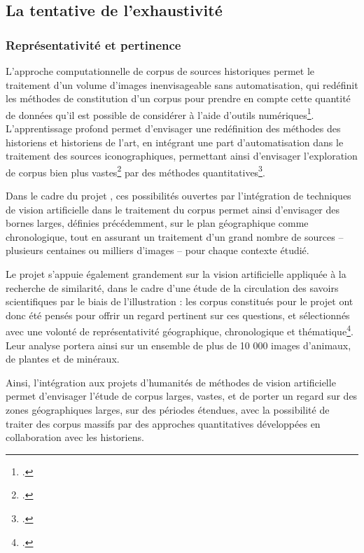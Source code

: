 
\subsection{La tentative de l’exhaustivité}
    \subsubsection{Représentativité et pertinence}
	L'approche computationnelle de corpus de sources historiques permet le traitement d'un volume d'images inenvisageable sans automatisation, qui redéfinit les méthodes de constitution d'un corpus pour prendre en compte cette quantité de données qu'il est possible de considérer à l'aide d'outils numériques\footcite{klinkeBigImageData2016}. L'apprentissage profond permet d'envisager une redéfinition des méthodes des historiens et historiens de l'art, en intégrant une part d'automatisation dans le traitement des sources iconographiques, permettant ainsi d'envisager l'exploration de corpus bien plus vastes\footcite{moiraghiExplorerCorpusImages2018} par des méthodes quantitatives\footcite{klinkeBigImageData2016}.
	
	Dans le cadre du projet \eida, ces possibilités ouvertes par l'intégration de techniques de vision artificielle dans le traitement du corpus permet ainsi d'envisager des bornes larges, définies précédemment, sur le plan géographique comme chronologique, tout en assurant un traitement d'un grand nombre de sources -- plusieurs centaines ou milliers d'images -- pour chaque contexte étudié. 
	
	Le projet \vhs s'appuie également grandement sur la vision artificielle appliquée à la recherche de similarité, dans le cadre d'une étude de la circulation des savoirs scientifiques par le biais de l'illustration : les corpus constitués pour le projet ont donc été pensés pour offrir un regard pertinent sur ces questions, et sélectionnés avec une volonté de représentativité géographique, chronologique et thématique\footcite{Corpus}. Leur analyse portera ainsi sur un ensemble de plus de 10 000 images d'animaux, de plantes et de minéraux.
	
	Ainsi, l'intégration aux projets d'humanités de méthodes de vision artificielle permet d'envisager l'étude de corpus larges, vastes, et de porter un regard sur des zones géographiques larges, sur des périodes étendues, avec la possibilité de traiter des corpus massifs par des approches quantitatives développées en collaboration avec les historiens.

